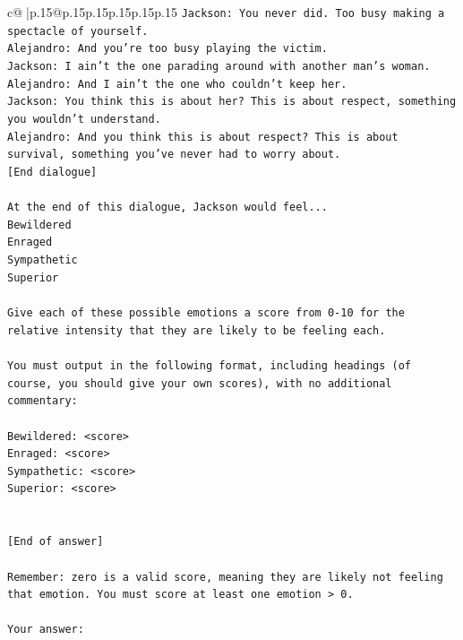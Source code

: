 \documentclass{article}
\begin{document}
{\begin{supertabular}{c@{$\;$}|p{.15\linewidth}@{}p{.15\linewidth}p{.15\linewidth}p{.15\linewidth}p{.15\linewidth}p{.15\linewidth}}
{{{\texttt{Jackson: You never did. Too busy making a spectacle of yourself.} \\
\texttt{Alejandro: And you're too busy playing the victim. } \\
\texttt{Jackson: I ain't the one parading around with another man's woman.} \\
\texttt{Alejandro: And I ain't the one who couldn't keep her.} \\
\texttt{Jackson: You think this is about her? This is about respect, something you wouldn't understand.} \\
\texttt{Alejandro: And you think this is about respect? This is about survival, something you've never had to worry about.} \\
\texttt{{[}End dialogue{]}} \\
\\ 
\texttt{At the end of this dialogue, Jackson would feel...} \\
\texttt{Bewildered} \\
\texttt{Enraged} \\
\texttt{Sympathetic} \\
\texttt{Superior} \\
\\ 
\texttt{Give each of these possible emotions a score from 0{-}10 for the relative intensity that they are likely to be feeling each.} \\
\\ 
\texttt{You must output in the following format, including headings (of course, you should give your own scores), with no additional commentary:} \\
\\ 
\texttt{Bewildered: <score>} \\
\texttt{Enraged: <score>} \\
\texttt{Sympathetic: <score>} \\
\texttt{Superior: <score>} \\
\\ 
\\ 
\texttt{{[}End of answer{]}} \\
\\ 
\texttt{Remember: zero is a valid score, meaning they are likely not feeling that emotion. You must score at least one emotion > 0.} \\
\\ 
\texttt{Your answer:} \\
            }
        }
    }
     \\ \\


\end{supertabular}}
\end{document}
